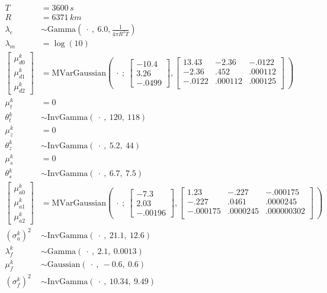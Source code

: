 \documentclass[12pt,letterpaper,onecolumn,oneside]{article}
\begin{document}
\begin{align*}
T & = 3600 \, s \\
R & = 6371 \, km \\
\lambda_e & \sim \text{Gamma}(\ \cdot \ , \ 6.0, \frac{1}{4 \pi R^2 T}) \\
\lambda_m & = \log(10) \\
\left[ 
  \begin{array}{l}
    \mu^k_{d0} \\
    \mu^k_{d1} \\
    \mu^k_{d2} 
  \end{array} \right] & = \text{MVarGaussian} \left( \ \cdot \ ; \
\left[
  \begin{array}{l}
    -10.4 \\
    3.26 \\
    -.0499
  \end{array}
\right]
 , 
\left[
  \begin{array}{lll}
    13.43 & -2.36 & -.0122 \\
    -2.36 & .452 & .000112 \\
    -.0122 & .000112 & .000125 \\
  \end{array}
\right]
\ \right) \\
\mu_t^k & = 0 \\
\theta_t^k & \sim \text{InvGamma}(\ \cdot \ , \ 120, \ 118) \\
\mu_z^k & = 0 \\
\theta_z^k & \sim \text{InvGamma}(\ \cdot \ , \ 5.2, \ 44) \\
\mu_s^k & = 0 \\
\theta_s^k & \sim \text{InvGamma}(\ \cdot \ , \ 6.7, \ 7.5) \\
\left[ 
  \begin{array}{l}
    \mu^k_{a0} \\
    \mu^k_{a1} \\
    \mu^k_{a2} 
  \end{array} \right] & = \text{MVarGaussian} \left( \ \cdot \ ; \
\left[
  \begin{array}{l}
    -7.3 \\
    2.03 \\
    -.00196
  \end{array}
\right]
 , 
\left[
  \begin{array}{lll}
    1.23 & -.227 & -.000175 \\
    -.227 & .0461 & .0000245 \\
    -.000175 & .0000245 & .000000302 \\
  \end{array}
\right]
\ \right) \\
(\sigma^k_a)^2 & \sim \text{InvGamma}(\ \cdot \ , \  21.1, \ 12.6) \\
\lambda^k_f & \sim \text{Gamma}(\ \cdot \ , \  2.1, \ 0.0013) \\
\mu^k_f & \sim \text{Gaussian}(\ \cdot \ , \  -0.6, \ 0.6) \\
(\sigma^k_f)^2 & \sim \text{InvGamma}(\ \cdot \ , \  10.34, \ 9.49) \\
\end{align*}
\end{document}
